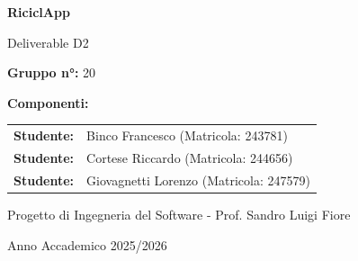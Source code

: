 \documentclass[12pt,a4paper]{article}
\begin{document}
\begin{titlepage}

    \centering
    \vspace*{2cm}
    {\Huge \textbf{RiciclApp} \par}
    \vspace{1cm}
    {\Large Deliverable D2 \par}
    \vspace{3cm}
    
    {\large \textbf{Gruppo n°:} 20 \par}
    \vspace{1.5cm}
    
    {\large \textbf{Componenti:} \par}
    \vspace{0.5cm}
    \begin{tabular}{rl}
        \textbf{Studente:} & Binco Francesco (Matricola: 243781) \\
        \textbf{Studente:} & Cortese Riccardo (Matricola: 244656) \\
        \textbf{Studente:} & Giovagnetti Lorenzo (Matricola: 247579) \\
    \end{tabular}
    
    \vfill
    {\large Progetto di Ingegneria del Software - Prof. Sandro Luigi Fiore \par}
    \vspace{1.5cm}
    {\large Anno Accademico 2025/2026 \par}
    \vspace{2cm}
\end{titlepage}


\begin{abstract}

Il presente progetto descrive l'ideazione e la progettazione di un sistema per l'ottimizzazione della raccolta differenziata urbana. 

L'obiettivo principale dell'applicazione è duplice: da un lato, semplificare il conferimento dei rifiuti per il cittadino attraverso strumenti di riconoscimento (scansione barcode) e localizzazione dei punti di raccolta con relativo stato di riempimento; dall'altro, fornire agli enti comunali e alle aziende di raccolta una visione d'insieme in tempo reale dello stato del territorio. 

Grazie ai dati trasmessi dai sensori IoT installati nei bidoni, l'amministratore può monitorare i livelli di riempimento, identificare le zone critiche e pianificare interventi di svuotamento mirati. Questo approccio permette di passare da una raccolta a calendario a una gestione dinamica "on-demand", riducendo i costi operativi e l'impatto ambientale dei mezzi di trasporto. 

Il sistema si avvale di una rete di sensori IoT installati nei bidoni stradali per il monitoraggio in tempo reale dei livelli di riempimento, permettendo agli operatori ecologici di usufruire di percorsi di raccolta ottimizzati. 
\end{abstract}
\end{document}
